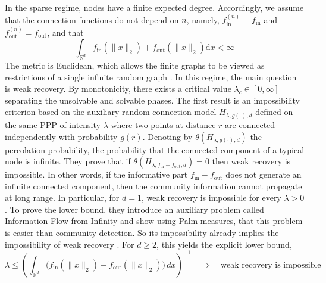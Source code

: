 \documentclass[runningheads]{llncs}
\begin{document}
In the sparse regime, nodes have a finite expected degree. Accordingly, we assume that the connection functions do not depend on \(n\), namely, \(f_\mathrm{in}^{(n)} = f_\mathrm{in}\) and \(f_\mathrm{out}^{(n)} = f_\mathrm{out}\), and that
\[
\int_{\mathbb R^d} f_\mathrm{in}(\|x\|_2) + f_\mathrm{out}(\|x\|_2)\mathrm{d}x < \infty
\]
The metric is Euclidean, which allows the finite graphs to be viewed as restrictions of a single infinite random graph \citep{last2018lectures}. In this regime, the main question is weak recovery. 
By monotonicity, there exists a critical value \(\lambda_c \in [0,\infty]\) separating the unsolvable and solvable phases. The first result is an impossibility criterion based on the auxiliary random connection model
\(H_{\lambda,g(\cdot),d}\) defined on the same PPP of intensity \(\lambda\) where two points at distance \(r\) are connected independently with probability \(g(r)\). Denoting by \(\theta(H_{\lambda,g(\cdot),d})\) the percolation probability, the probability that the connected component of a typical node is infinite. They prove that if \(\theta(H_{\lambda,f_\mathrm{in}-f_\mathrm{out},d})=0\) then weak recovery is impossible. In other words, if the informative part \(f_\mathrm{in}-f_\mathrm{out}\) does not generate an infinite connected component, then the community information cannot propagate at long range. In particular, for \(d=1\), weak recovery is impossible for every \(\lambda>0\).
To prove the lower bound, they introduce an auxiliary problem called Information Flow from Infinity and show using Palm measures, that this problem is easier than community detection.
So its impossibility already implies the impossibility of weak recovery \citep{abbe2021community}.
For \(d\ge 2\), this yields the explicit lower bound,
\[
\lambda \le \left(\int_{\mathbb R^d}\bigl(f_\mathrm{in}(\|x\|_2)-f_\mathrm{out}(\|x\|_2)\bigr)\,dx\right)^{-1}
\quad\Longrightarrow\quad
\text{weak recovery is impossible}
\]
\end{document}
